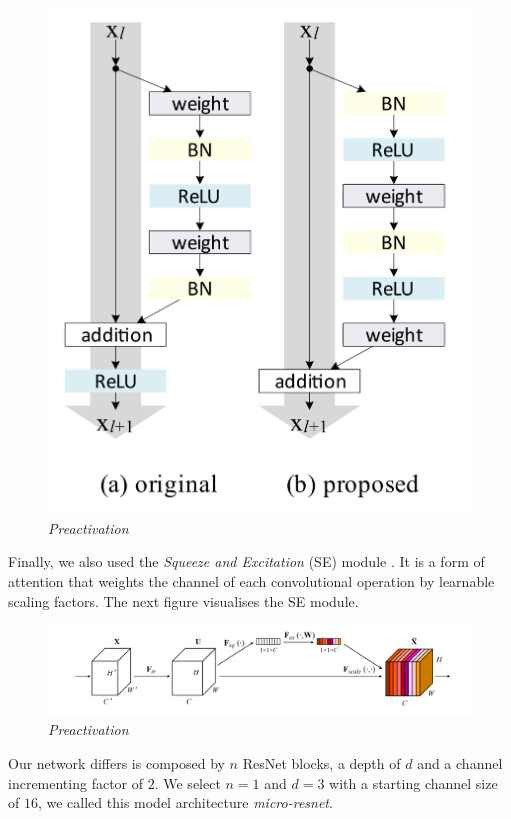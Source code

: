 \documentclass[../document.tex]{subfiles}
\begin{document}
\begin{figure}[H]
    \centering
    \includegraphics[scale=0.2]{../img/implementation/estimator/preactivation.png}
    \caption{\emph{Preactivation}}
\end{figure}
Finally, we also used the \emph{Squeeze and Excitation} (SE) module \cite{hu2017squeeze}. It is a form of attention that weights the channel of each convolutional operation by learnable scaling factors. The next figure visualises the SE module.
\begin{figure}[H]
    \centering
    \includegraphics[width=\linewidth]{../img/implementation/estimator/se.png}
    \caption{\emph{Preactivation}}
\end{figure}
Our network differs is composed by $n$ ResNet blocks, a depth of $d$ and a channel incrementing factor of $2$. We select $n=1$ and $d=3$ with a starting channel size of $16$, we called this model architecture \emph{micro-resnet}. 
\end{document}
